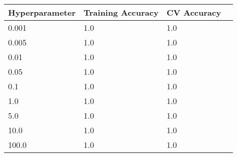 \def\arraystretch{1.25}
\begin{center}
{\small
\begin{tabular}{l l l c}
\hline
\hline
\textbf{Hyperparameter}&\textbf{Training Accuracy} & \textbf{CV Accuracy}\\
\hline
\hline
0.001&1.0&1.0\\
0.005&1.0&1.0\\
0.01&1.0&1.0\\
0.05&1.0&1.0\\
0.1&1.0&1.0\\
1.0&1.0&1.0\\
5.0&1.0&1.0\\
10.0&1.0&1.0\\
100.0&1.0&1.0\\
\hline

\end{tabular}

}
\end{center}